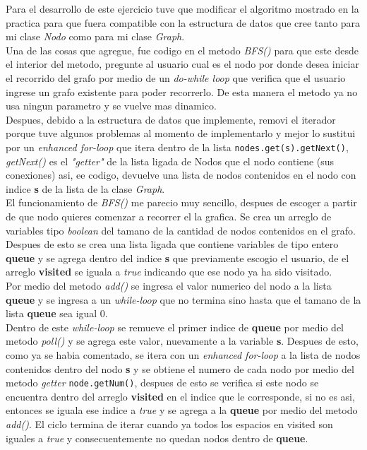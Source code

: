 \documentclass{article}
\begin{document}
			Para el desarrollo de este ejercicio tuve que modificar el algoritmo mostrado en la practica para que fuera compatible con la estructura de datos que cree tanto para mi clase \emph{Nodo} como para mi clase \emph{Graph}.\\
			
			Una de las cosas que agregue, fue codigo en el metodo \emph{BFS()} para que este desde el interior del metodo, pregunte al usuario cual es el nodo por donde desea iniciar el recorrido del grafo por medio de un \textit{do-while loop} que verifica que el usuario ingrese un grafo existente para poder recorrerlo. De esta manera el metodo ya no usa ningun parametro y se vuelve mas dinamico.\\
			
			Despues, debido a la estructura de datos que implemente, removi el iterador porque tuve algunos problemas al momento de implementarlo y mejor lo sustitui por un \textit{enhanced for-loop} que itera dentro de la lista \verb|nodes.get(s).getNext()|, \textit{getNext()} es el \textit{"getter"} de la lista ligada de Nodos que el nodo contiene (sus conexiones) asi, ee codigo, devuelve una lista de nodos contenidos en el nodo con indice \textbf{s} de la lista de la clase \emph{Graph}.\\
			
			El funcionamiento de \emph{BFS()} me parecio muy sencillo, despues de escoger a partir de que nodo quieres comenzar a recorrer el la grafica. Se crea un arreglo de variables tipo \textit{boolean} del tamano de la cantidad de nodos contenidos en el grafo. Despues de esto se crea una lista ligada que contiene variables de tipo entero \textbf{queue} y se agrega dentro del indice \textbf{s} que previamente escogio el usuario, de el arreglo \textbf{visited} se iguala a \textit{true} indicando que ese nodo ya ha sido visitado.\\
			
			Por medio del metodo \emph{add()} se ingresa el valor numerico del nodo a la lista \textbf{queue} y se ingresa a un \textit{while-loop} que no termina sino hasta que el tamano de la lista \textbf{queue} sea igual 0.\\
			
			Dentro de este \textit{while-loop} se remueve el primer indice de \textbf{queue} por medio del metodo \emph{poll()} y se agrega este valor, nuevamente a la variable \textbf{s}. Despues de esto, como ya se habia comentado, se itera con un \textit{enhanced for-loop} a la lista de nodos contenidos dentro del nodo \textbf{s} y se obtiene el numero de cada nodo por medio del metodo \textit{getter} \verb|node.getNum()|, despues de esto se verifica si este nodo se encuentra dentro del arreglo \textbf{visited} en el indice que le corresponde, si no es asi, entonces se iguala ese indice a \textit{true} y se agrega a la \textbf{queue} por medio del metodo \emph{add()}. El ciclo termina de iterar cuando ya todos los espacios en visited son iguales a \textit{true} y consecuentemente no quedan nodos dentro de \textbf{queue}.
			
\end{document}
